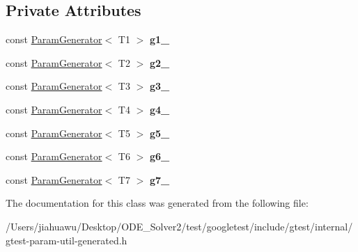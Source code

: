 \subsection*{Private Attributes}
\begin{DoxyCompactItemize}
\item 
\mbox{\label{classtesting_1_1internal_1_1_cartesian_product_generator7_ad8ec75a361810570feb4f6c0699f7f76}} 
const \mbox{\hyperlink{classtesting_1_1internal_1_1_param_generator}{Param\+Generator}}$<$ T1 $>$ {\bfseries g1\+\_\+}
\item 
\mbox{\label{classtesting_1_1internal_1_1_cartesian_product_generator7_a2e094d1b0e7d99b28828475c9871f4e3}} 
const \mbox{\hyperlink{classtesting_1_1internal_1_1_param_generator}{Param\+Generator}}$<$ T2 $>$ {\bfseries g2\+\_\+}
\item 
\mbox{\label{classtesting_1_1internal_1_1_cartesian_product_generator7_a24a56a59e1f27f5a97d8ed231bb48d6f}} 
const \mbox{\hyperlink{classtesting_1_1internal_1_1_param_generator}{Param\+Generator}}$<$ T3 $>$ {\bfseries g3\+\_\+}
\item 
\mbox{\label{classtesting_1_1internal_1_1_cartesian_product_generator7_ae5c1eac036b8355439f7eb411e639355}} 
const \mbox{\hyperlink{classtesting_1_1internal_1_1_param_generator}{Param\+Generator}}$<$ T4 $>$ {\bfseries g4\+\_\+}
\item 
\mbox{\label{classtesting_1_1internal_1_1_cartesian_product_generator7_a606bdd6a8bb57eb65172455b0ea6b78f}} 
const \mbox{\hyperlink{classtesting_1_1internal_1_1_param_generator}{Param\+Generator}}$<$ T5 $>$ {\bfseries g5\+\_\+}
\item 
\mbox{\label{classtesting_1_1internal_1_1_cartesian_product_generator7_a37eac7a1d8524cd43bbfe9d6aaa69901}} 
const \mbox{\hyperlink{classtesting_1_1internal_1_1_param_generator}{Param\+Generator}}$<$ T6 $>$ {\bfseries g6\+\_\+}
\item 
\mbox{\label{classtesting_1_1internal_1_1_cartesian_product_generator7_a77db4fd537002107c3116a09e1895c84}} 
const \mbox{\hyperlink{classtesting_1_1internal_1_1_param_generator}{Param\+Generator}}$<$ T7 $>$ {\bfseries g7\+\_\+}
\end{DoxyCompactItemize}


The documentation for this class was generated from the following file\+:\begin{DoxyCompactItemize}
\item 
/\+Users/jiahuawu/\+Desktop/\+O\+D\+E\+\_\+\+Solver2/test/googletest/include/gtest/internal/gtest-\/param-\/util-\/generated.\+h\end{DoxyCompactItemize}
